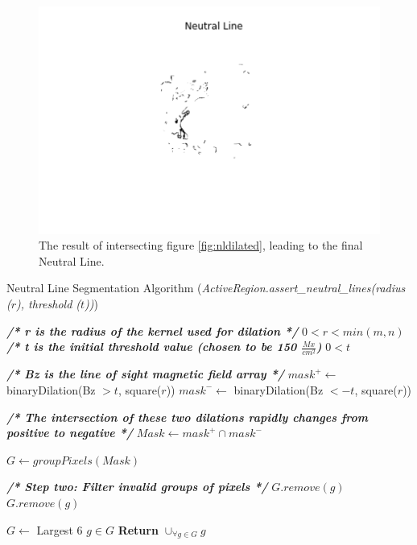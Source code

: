\documentclass[defaultstyle,11pt]{thesis}
\begin{document}
\begin{figure}[h]
    \centering
    \includegraphics[width=0.7\linewidth]{ThesisFilePkg/figures/data/neutralline.png}
    \caption{The result of intersecting figure \ref{fig:nldilated}, leading to the final Neutral Line.}
    \label{fig:nlfinal}
\end{figure}


\begin{algorithm}
\caption{Neutral Line Segmentation Algorithm (\textit{ActiveRegion.assert\_neutral\_lines(radius ($r$), threshold ($t$))})}\label{alg:nl}
\label{alg:NL}

\begin{algorithmic}[1]

\State
\State \textbf{\textit{/* r is the radius of the kernel used for dilation */}}
\Require $0 < r < min(m,n)$ 
\State
\State \textbf{\textit{/* t is the initial threshold value (chosen to be 150 $\frac{Mx}{cm^2}$)}}
\Require $0 < t$

\State
\State \textbf{\textit{/* Bz is the line of sight magnetic field array */}}
\State $mask^{+} \gets$ binaryDilation(Bz $> t$, square($r$)) 
\State $mask^{-} \gets$ binaryDilation(Bz $< -t$, square($r$)) 

\State
\State \textbf{\textit{/* The intersection of these two dilations rapidly changes from positive to negative */}}
\State $Mask \gets mask^+ \cap mask^-$ 

\State

\State $G \gets groupPixels(Mask)$ 

\State 
\State \textbf{\textit{/* Step two: Filter invalid groups of pixels */}}
        \State $G.remove(g)$
    \EndIf
        \State $G.remove(g)$
    \EndIf
\EndFor

\State
\State $G \gets $ Largest 6 $g \in G$ 
\State
\State \textbf{Return} $\cup_{\forall g \in G}g$ 
\end{algorithmic}
\end{algorithm}
\end{document}
